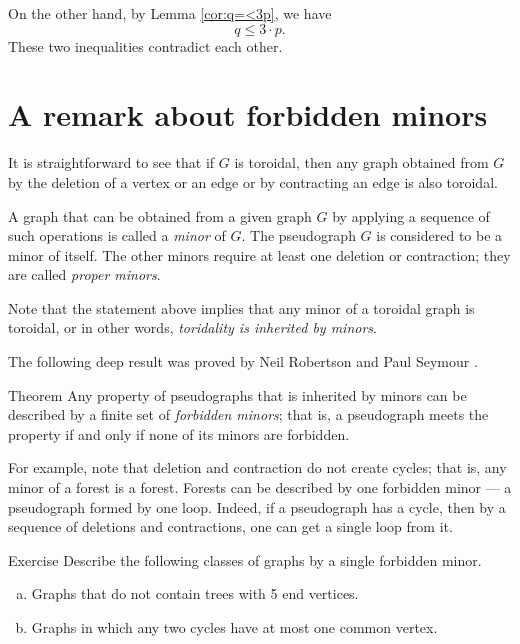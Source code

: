 On the other hand, by Lemma \ref{cor:q=<3p}, we have
\[q\le 3\cdot p.\]
These two inequalities contradict each other.
 \qeds

\section{A remark about forbidden minors}

It is straightforward to see that if $G$ is toroidal, then any graph obtained from $G$ by the deletion of a vertex or an edge or by contracting an edge is also toroidal.

A graph that can be obtained from a given graph $G$ by applying a sequence of such operations is called a \emph{minor} of $G$.
The pseudograph $G$ is considered to be a minor of itself.
The other minors require at least one deletion or contraction; they are called \emph{proper minors}.

Note that the statement above implies that any minor of a toroidal graph is toroidal, or in other words, \textit{toridality is inherited by minors}.

The following deep result was proved by Neil Robertson and Paul Seymour \cite{robertson-seymour}.

\begin{thm}{Theorem}
Any property of pseudographs that is inherited by minors can be 
described by a finite set of \emph{forbidden minors};
that is,  a pseudograph meets the property if and only if none of its minors are forbidden.
\end{thm}

For example, note that deletion and contraction do not create cycles;
that is, any minor of a forest is a forest.
Forests can be described by one forbidden minor --- a pseudograph formed by one loop.
Indeed, if a pseudograph has a cycle, then by a sequence of deletions and contractions, one can get a single loop from it.

\begin{thm}{Exercise}\label{ex:forbidden-minors}
Describe the following classes of graphs by a single forbidden minor.
\begin{enumerate}[(a)]
 \item\label{ex:forbidden-minors:tree5} Graphs that do not contain trees with 5 end vertices.
 \item\label{ex:forbidden-minors:cycle} Graphs in which any two cycles have at most one common vertex.
\end{enumerate}
\end{thm}

